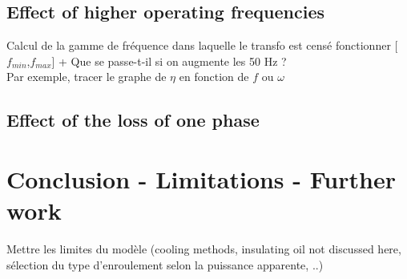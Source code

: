 \documentclass[12pt,a4paper]{report}
\begin{document}
\subsection{Effect of higher operating frequencies}
Calcul de la gamme de fréquence dans laquelle le transfo est censé fonctionner [$f_{min}$,$f_{max}$] + Que se passe-t-il si on augmente les 50 Hz ?\\

Par exemple, tracer le graphe de $\eta$ en fonction de $f$ ou $\omega$

\subsection{Effect of the loss of one phase}

\section{Conclusion - Limitations - Further work}
Mettre les limites du modèle (cooling methods, insulating oil not discussed here, sélection du type d'enroulement selon la puissance apparente, ..)
\end{document}
